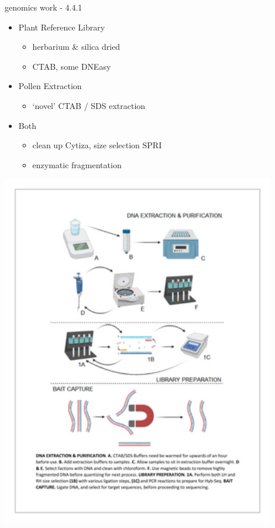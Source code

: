 \documentclass[
  ignorenonframetext,
]{beamer}
\providecommand{\tightlist}{%
  \setlength{\itemsep}{0pt}\setlength{\parskip}{0pt}}
\begin{document}
\begin{frame}{genomics work - 4.4.1}
\protect\hypertarget{genomics-work---4.4.1}{}
\begin{itemize}
\tightlist
\item
  Plant Reference Library

  \begin{itemize}
  \tightlist
  \item
    herbarium \& silica dried\\
  \item
    CTAB, some DNEasy
  \end{itemize}
\item
  Pollen Extraction

  \begin{itemize}
  \tightlist
  \item
    `novel' CTAB / SDS extraction
  \end{itemize}
\item
  Both

  \begin{itemize}
  \tightlist
  \item
    clean up Cytiza, size selection SPRI\\
  \item
    enzymatic fragmentation
  \end{itemize}
\end{itemize}

\includegraphics[width=0.9\textwidth,height=\textheight]{../graphics/assorted/molecular_metagenomic_workflow.resized.png}
\end{frame}
\end{document}
